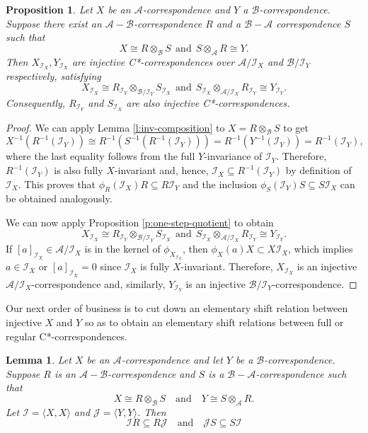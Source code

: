 \documentclass[11pt, letterpaper,final]{amsart}
\newcommand{\A}{{\mathcal{A}}}
\newcommand{\B}{{\mathcal{B}}}
\newcommand{\I}{{\mathcal{I}}}
\newcommand{\J}{{\mathcal{J}}}
\newtheorem{lem}[thm]{Lemma}
\newtheorem{prp}[thm]{Proposition}
\theoremstyle{definition}
\begin{document}
\begin{prp} \label{prp:to-injective}
Let $X$ be an $\A$-correspondence and $Y$ a $\B$-correspondence. Suppose there exist an $\A-\B$-correspondence $R$ and a $\B-\A$ correspondence $S$ such that
$$
X \cong R\otimes_{\B} S \ \ \text{and} \ \ S\otimes_{\A}R \cong Y.
$$
Then $X_{\I_X}, Y_{\I_X}$ are injective C*-correspondences over $\A/\I_X$ and $\B/\I_Y$ respectively, satisfying
$$
X_{\I_X} \cong R_{\I_Y}\otimes_{\B / \I_Y} S_{\I_X} \ \ \text{and} \ \ S_{\I_X}\otimes_{\A / \I_X}R_{\I_Y} \cong Y_{\I_Y}.
$$
Consequently, $R_{\I_Y}$ and $S_{\I_X}$ are also injective C*-correspondences.
\end{prp}
\begin{proof}
  We can apply Lemma \ref{l:inv-composition} to $X = R\otimes_{\B} S$ to get
  \[
    X^{-1}(R^{-1}(\I_Y)) \cong R^{-1}(S^{-1}(R^{-1}(\I_Y)))=R^{-1}(Y^{-1}(\I_Y)) = R^{-1}(\I_Y),
  \]
  where the last equality follows from the full $Y$-invariance of $\I_Y$.
  Therefore, $R^{-1}(\I_Y)$ is also fully $X$-invariant and, hence, $\I_X\subseteq R^{-1}(\I_Y)$ by definition of $\I_X$.
  This proves that $\phi_R(\I_X)R\subseteq R\I_Y$ and the inclusion $\phi_S(\I_Y)S \subseteq S\I_X$ can be obtained analogously.

  We can now apply Proposition \ref{p:one-step-quotient} to obtain
  \[
    X_{\I_X} \cong R_{\I_Y}\otimes_{\B / \I_Y} S_{\I_X} \ \ \text{and} \ \ S_{\I_X}\otimes_{\A / \I_X}R_{\I_Y} \cong Y_{\I_Y}.
\]
If $[a]_{\I_X}\in \A/\I_X$ is in the kernel of $\phi_{X_{\I_X}}$, then $\phi_X(a)X\subset X\I_X$, which implies $a\in \I_X$ or $[a]_{\I_X}=0$ since $\I_X$ is fully $X$-invariant.
Therefore, $X_{\I_X}$ is an injective $\A/\I_X$-correspondence and, similarly, $Y_{\I_Y}$ is an injective $\B/\I_Y$-correspondence.
\end{proof}

Our next order of business is to cut down an elementary shift relation between injective $X$ and $Y$ so as to obtain an elementary shift relations between full or regular C*-correspondences.

\begin{lem} \label{lem:invariant-full-ideal}
Let $X$ be an $\A$-correspondence and let $Y$ be a $\B$-corres\-pondence. Suppose $R$ is an $\A-\B$-correspondence and $S$ is a $\B-\A$-correspondence such that 
$$
X \cong R \otimes_{\B} S \quad \text{and} \quad Y \cong S \otimes_{\A} R.
$$
Let $\I = \langle X, X \rangle$ and $\J = \langle Y,Y \rangle$.  Then 
$$
\I R \subseteq R \J \quad \text{and} \quad \J S \subseteq S \I
$$
\end{lem}
\end{document}
